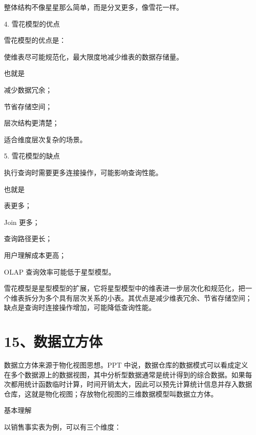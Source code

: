 \documentclass[UTF8,zihao=-4]{ctexart}
\begin{document}
整体结构不像星星那么简单，而是分叉更多，像雪花一样。\par

4. 雪花模型的优点\par

雪花模型的优点是：\par

使维表尽可能规范化，最大限度地减少维表的数据存储量。\par

也就是\par

减少数据冗余；\par
节省存储空间；\par
层次结构更清楚；\par
适合维度层次复杂的场景。\par

5. 雪花模型的缺点\par

执行查询时需要更多连接操作，可能影响查询性能。\par

也就是\par

表更多；\par
Join 更多；\par
查询路径更长；\par
用户理解成本更高；\par
OLAP 查询效率可能低于星型模型。\par

雪花模型是星型模型的扩展，它将星型模型中的维表进一步层次化和规范化，把一个维表拆分为多个具有层次关系的小表。其优点是减少维表冗余、节省存储空间；缺点是查询时连接操作增加，可能降低查询性能。\par

\newpage
\section*{15、数据立方体}

数据立方体来源于物化视图思想。PPT 中说，数据仓库的数据模式可以看成定义在多个数据源上的数据视图，其中分析型数据通常是统计得到的综合数据。如果每次都用统计函数临时计算，时间开销太大，因此可以预先计算统计信息并存入数据仓库，这就是物化视图；存放物化视图的三维数据模型叫数据立方体。\par

基本理解\par

以销售事实表为例，可以有三个维度：\par
\end{document}
